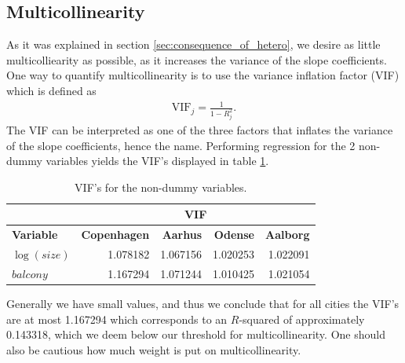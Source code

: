 \subsection{Multicollinearity}
As it was explained in section \ref{sec:consequence_of_hetero}, we desire as little multicolliearity as possible, as it increases the variance of the slope coefficients.
One way to quantify multicollinearity is
to use the variance inflation factor (VIF) which is defined as
\begin{align*}
    \text{VIF}_j = \frac{1}{1 - R^2_j}.
\end{align*}
The VIF can be interpreted as one of the three factors that inflates the variance of the slope coefficients, hence the name.
Performing regression for the 2 non-dummy variables yields the VIF's displayed in table \ref{tbl:vif}.
\begin{table}[H]
    \centering
    \begin{tabular}{lrrrr}
        \toprule
        & \multicolumn{4}{c}{\textbf{VIF}} \\
        \midrule
        \textbf{Variable} & \textbf{Copenhagen} & \textbf{Aarhus} & \textbf{Odense} & \textbf{Aalborg} \\
        \midrule
        $\log(size)$                & 1.078182 & 1.067156 & 1.020253 & 1.022091 \\
        $balcony$                   & 1.167294 & 1.071244 & 1.010425 & 1.021054 \\
        \bottomrule
    \end{tabular}
    \caption{VIF's for the non-dummy variables.}
    \label{tbl:vif}
\end{table}
Generally we have small values, and
thus we conclude that for all cities the VIF's are at most 1.167294 which corresponds to an $R$-squared of approximately 0.143318, which we deem below our threshold for multicollinearity.
One should also be cautious how much weight is put on multicollinearity.

